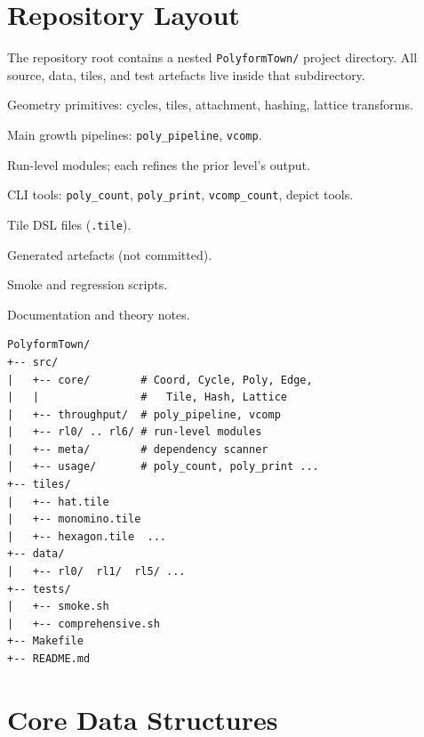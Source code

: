 \documentclass[10pt,a4paper]{article}
\let\polysection\section
\renewcommand\section{\needspace{0.16\textheight}\polysection}
\newcommand{\code}[1]{\texttt{\small #1}}
\newcommand{\file}[1]{\texttt{\footnotesize #1}}
\begin{document}
\section{Repository Layout}

\begin{tcolorbox}[dualbox, title=Directory Structure]
  The repository root contains a nested \file{PolyformTown/}
  project directory.  All source, data, tiles, and test artefacts live
  inside that subdirectory.

  \begin{description}[leftmargin=0pt, style=nextline]
    \item[\file{src/core/}] Geometry primitives: cycles, tiles,
      attachment, hashing, lattice transforms.
    \item[\file{src/throughput/}] Main growth pipelines:
      \code{poly\_pipeline}, \code{vcomp}.
    \item[\file{src/rl0/}--\file{src/rl6/}] Run-level modules; each
      refines the prior level's output.
    \item[\file{src/usage/}] CLI tools: \code{poly\_count},
      \code{poly\_print}, \code{vcomp\_count}, depict tools.
    \item[\file{tiles/}] Tile DSL files (\file{.tile}).
    \item[\file{data/}] Generated artefacts (not committed).
    \item[\file{tests/}] Smoke and regression scripts.
    \item[\file{manual/}] Documentation and theory notes.
  \end{description}
\tcblower
\begin{verbatim}
PolyformTown/
+-- src/
|   +-- core/        # Coord, Cycle, Poly, Edge,
|   |                #   Tile, Hash, Lattice
|   +-- throughput/  # poly_pipeline, vcomp
|   +-- rl0/ .. rl6/ # run-level modules
|   +-- meta/        # dependency scanner
|   +-- usage/       # poly_count, poly_print ...
+-- tiles/
|   +-- hat.tile
|   +-- monomino.tile
|   +-- hexagon.tile  ...
+-- data/
|   +-- rl0/  rl1/  rl5/ ...
+-- tests/
|   +-- smoke.sh
|   +-- comprehensive.sh
+-- Makefile
+-- README.md
\end{verbatim}
\end{tcolorbox}

\section{Core Data Structures}
\end{document}
